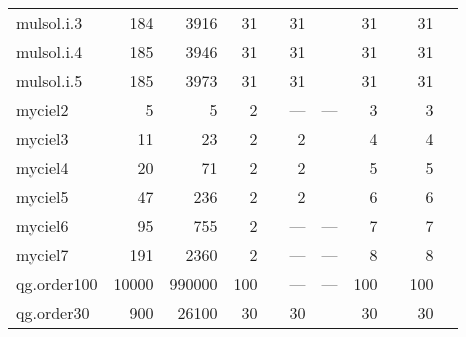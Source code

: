 \begin{table}[t]
\begin{tabular}{lrrrlrlrlrl}
  mulsol.i.3 & 184 & 3916 & 31 & \cite{Malaguti2011,Gualandi2012} & 31 & \cite{Gualandi2012} & 31 & \cite{Mehrotra1996,Mehrotra1996,Malaguti2011,Gualandi2012,Mendez-Diaz2006} & 31 & \cite{Mehrotra1996,Mehrotra1996,Malaguti2011,Gualandi2012,Mendez-Diaz2006,Brelaz1979,Sewell1996,Segundo2012} \\ 
  mulsol.i.4 & 185 & 3946 & 31 & \cite{Malaguti2011,Gualandi2012} & 31 & \cite{Gualandi2012} & 31 & \cite{Mehrotra1996,Mehrotra1996,Malaguti2011,Gualandi2012,Mendez-Diaz2006} & 31 & \cite{Mehrotra1996,Mehrotra1996,Malaguti2011,Gualandi2012,Mendez-Diaz2006,Brelaz1979,Sewell1996,Segundo2012} \\ 
  mulsol.i.5 & 185 & 3973 & 31 & \cite{Gualandi2012} & 31 & \cite{Gualandi2012} & 31 & \cite{Mehrotra1996,Mehrotra1996,Malaguti2011,Gualandi2012,Mendez-Diaz2006} & 31 & \cite{Mehrotra1996,Mehrotra1996,Malaguti2011,Gualandi2012,Mendez-Diaz2006,Brelaz1979,Sewell1996,Segundo2012} \\ 
  myciel2 & 5 & 5 & 2 & \cite{Malaguti2011} & --- & --- & 3 & \cite{Mehrotra1996,Mehrotra1996} & 3 & \cite{Mehrotra1996,Mehrotra1996} \\ 
  myciel3 & 11 & 23 & 2 & \cite{Malaguti2011,Gualandi2012} & 2 & \cite{Gualandi2012} & 4 & \cite{Mehrotra1996,Mehrotra1996,Gualandi2012} & 4 & \cite{Mehrotra1996,Mehrotra1996,Wu2013a,Gualandi2012,Zhou2016} \\ 
  myciel4 & 20 & 71 & 2 & \cite{Malaguti2011} & 2 & \cite{Gualandi2012} & 5 & \cite{Mehrotra1996,Mehrotra1996,Gualandi2012} & 5 & \cite{Mehrotra1996,Mehrotra1996,Wu2013a,Gualandi2012,Zhou2016} \\ 
  myciel5 & 47 & 236 & 2 & \cite{Malaguti2011} & 2 & \cite{Gualandi2012} & 6 & \cite{Mehrotra1996,Gualandi2012} & 6 & \cite{Mehrotra1996,Wu2013a,Gualandi2012,Zhou2016} \\ 
  myciel6 & 95 & 755 & 2 & \cite{Malaguti2011} & --- & --- & 7 & \cite{Malaguti2010,Malaguti2011} & 7 & \cite{Malaguti2010,Malaguti2011,Wu2013a,Gualandi2012,Mendez-Diaz2006,Brelaz1979,Sewell1996,Segundo2012,Zhou2016} \\ 
  myciel7 & 191 & 2360 & 2 & \cite{Malaguti2011} & --- & --- & 8 & \cite{Malaguti2010,Malaguti2011} & 8 & \cite{Malaguti2010,Malaguti2011,Wu2013a,Gualandi2012,Mendez-Diaz2006,Brelaz1979,Sewell1996,Segundo2012,Zhou2016} \\ 
  qg.order100 & 10000 & 990000 & 100 & \cite{us} & --- & --- & 100 & \cite{Gomes2002} & 100 & \cite{Gomes2002} \\ 
  qg.order30 & 900 & 26100 & 30 & \cite{Malaguti2011,Gualandi2012} & 30 & \cite{Gualandi2012} & 30 & \cite{Mendez-Diaz2006,Mendez-Diaz2006,Malaguti2011,Gualandi2012} & 30 & \cite{Mendez-Diaz2006,Mendez-Diaz2006,Malaguti2011,Wu2013a,Gualandi2012,Brelaz1979,Segundo2012,Sewell1996} \\ 

\end{tabular}
\end{table}
